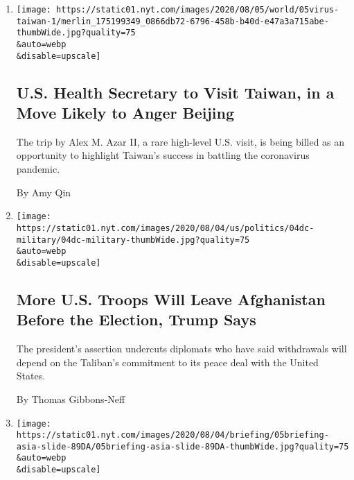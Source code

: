\begin{enumerate}
\def\labelenumi{\arabic{enumi}.}
\item
  \href{/2020/08/04/world/asia/taiwan-azar-beijing-coronavirus.html}{}

  \texttt{[image: https://static01.nyt.com/images/2020/08/05/world/05virus-taiwan-1/merlin\_175199349\_0866db72-6796-458b-b40d-e47a3a715abe-thumbWide.jpg?quality=75\\\&auto=webp\\\&disable=upscale]}

  \hypertarget{us-health-secretary-to-visit-taiwan-in-a-move-likely-to-anger-beijing}{%
  \subsection{U.S. Health Secretary to Visit Taiwan, in a Move Likely to
  Anger
  Beijing}\label{us-health-secretary-to-visit-taiwan-in-a-move-likely-to-anger-beijing}}

  The trip by Alex M. Azar II, a rare high-level U.S. visit, is being
  billed as an opportunity to highlight Taiwan's success in battling the
  coronavirus pandemic.

  By Amy Qin
\item
  \href{/2020/08/04/world/asia/us-troops-afghanistan.html}{}

  \texttt{[image: https://static01.nyt.com/images/2020/08/04/us/politics/04dc-military/04dc-military-thumbWide.jpg?quality=75\\\&auto=webp\\\&disable=upscale]}

  \hypertarget{more-us-troops-will-leave-afghanistan-before-the-election-trump-says}{%
  \subsection{More U.S. Troops Will Leave Afghanistan Before the
  Election, Trump
  Says}\label{more-us-troops-will-leave-afghanistan-before-the-election-trump-says}}

  The president's assertion undercuts diplomats who have said
  withdrawals will depend on the Taliban's commitment to its peace deal
  with the United States.

  By Thomas Gibbons-Neff
\item
  \href{/2020/08/04/briefing/beirut-explosion-melbourne-lockdown-pakistan.html}{}

  \texttt{[image: https://static01.nyt.com/images/2020/08/04/briefing/05briefing-asia-slide-89DA/05briefing-asia-slide-89DA-thumbWide.jpg?quality=75\\\&auto=webp\\\&disable=upscale]}

  \hypertarget{beirut-blasts-melbourne-lockdown-island-sos-your-wednesday-briefing}{%
}
\end{enumerate}
